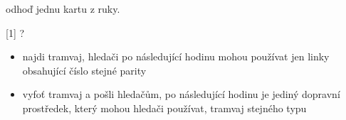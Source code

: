 \begin{cards}
	\cost odhoď jednu kartu z ruky.
	
	 ?
	\begin{itemize}
		\item najdi tramvaj, hledači po následující hodinu mohou používat jen linky obsahující číslo stejné parity
		\item vyfoť tramvaj a pošli hledačům, po následující hodinu je jediný dopravní prostředek, který mohou hledači používat, tramvaj stejného typu
	\end{itemize}
\end{cards}
